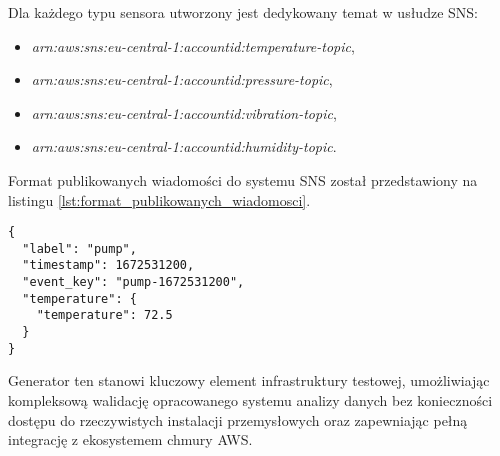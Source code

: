 Dla każdego typu sensora utworzony jest dedykowany temat w usłudze SNS:

\begin{itemize}
    \item \textit{arn:aws:sns:eu-central-1:accountid:temperature-topic},
    \item \textit{arn:aws:sns:eu-central-1:accountid:pressure-topic},
    \item \textit{arn:aws:sns:eu-central-1:accountid:vibration-topic},
    \item \textit{arn:aws:sns:eu-central-1:accountid:humidity-topic}.
\end{itemize}

\newpage

Format publikowanych wiadomości do systemu SNS został przedstawiony na listingu \ref{lst:format_publikowanych_wiadomosci}.

\begin{lstlisting}[caption=Format publikowanych wiadomości, label={lst:format_publikowanych_wiadomosci}]
{
  "label": "pump",
  "timestamp": 1672531200,
  "event_key": "pump-1672531200",
  "temperature": {
    "temperature": 72.5
  }
}
\end{lstlisting}


Generator ten stanowi kluczowy element infrastruktury testowej, umożliwiając kompleksową walidację opracowanego systemu analizy danych bez konieczności dostępu do rzeczywistych instalacji przemysłowych oraz zapewniając pełną integrację z ekosystemem chmury AWS.